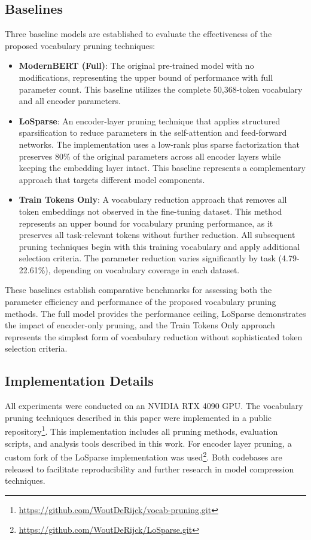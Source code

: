 \documentclass[twocolumn]{article}
\begin{document}




\subsection{Baselines}
Three baseline models are established to evaluate the effectiveness of the proposed vocabulary pruning techniques:

\begin{itemize}
    \item \textbf{ModernBERT (Full)}: The original pre-trained model with no modifications, representing the upper bound of performance with full parameter count. This baseline utilizes the complete 50,368-token vocabulary and all encoder parameters.
    \item \textbf{LoSparse}: An encoder-layer pruning technique that applies structured sparsification to reduce parameters in the self-attention and feed-forward networks. The implementation uses a low-rank plus sparse factorization that preserves 80\% of the original parameters across all encoder layers while keeping the embedding layer intact. This baseline represents a complementary approach that targets different model components.
    \item \textbf{Train Tokens Only}: A vocabulary reduction approach that removes all token embeddings not observed in the fine-tuning dataset. This method represents an upper bound for vocabulary pruning performance, as it preserves all task-relevant tokens without further reduction. All subsequent pruning techniques begin with this training vocabulary and apply additional selection criteria. The parameter reduction varies significantly by task (4.79-22.61\%), depending on vocabulary coverage in each dataset.
\end{itemize}
These baselines establish comparative benchmarks for assessing both the parameter efficiency and performance of the proposed vocabulary pruning methods. The full model provides the performance ceiling, LoSparse demonstrates the impact of encoder-only pruning, and the Train Tokens Only approach represents the simplest form of vocabulary reduction without sophisticated token selection criteria.


\subsection{Implementation Details}
All experiments were conducted on an NVIDIA RTX 4090 GPU. The vocabulary pruning techniques described in this paper were implemented in a public repository\footnote{\url{https://github.com/WoutDeRijck/vocab-pruning.git}}. This implementation includes all pruning methods, evaluation scripts, and analysis tools described in this work. For encoder layer pruning, a custom fork of the LoSparse implementation was used\footnote{\url{https://github.com/WoutDeRijck/LoSparse.git}}. Both codebases are released to facilitate reproducibility and further research in model compression techniques.
\end{document}
